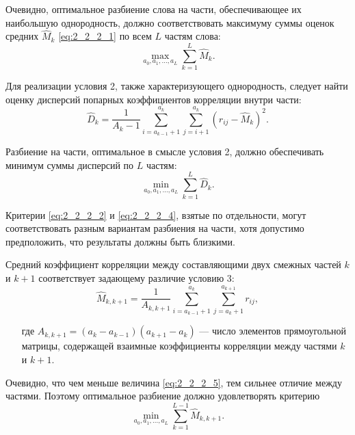 Очевидно, оптимальное разбиение слова на части, обеспечивающее их наибольшую однородность, должно соответствовать максимуму суммы оценок средних $\widehat{M}_k$ \eqref{eq:2_2_2_1} по всем $L$ частям слова:
\begin{equation}\label{eq:2_2_2_2}
\max_{a_0, a_1, \dots, a_L} \sum_{k=1}^L \widehat{M}_k.
\end{equation}

Для реализации условия 2, также характеризующего однородность, следует найти оценку дисперсий попарных коэффициентов корреляции внутри части:
\begin{equation}\label{eq:2_2_2_3}
\widehat{D}_k = \frac{1}{A_k-1} \sum^{a_k}_{i=a_{k-1}+1} \sum^{a_k}_{j=i+1} (r_{ij} - \widehat{M}_k)^2.
\end{equation}

Разбиение на части, оптимальное в смысле условия 2, должно обеспечивать минимум суммы дисперсий по $L$ частям:
\begin{equation}\label{eq:2_2_2_4}
\min_{a_0, a_1, \dots, a_L} \sum_{k=1}^L \widehat{D}_k.
\end{equation}

Критерии \eqref{eq:2_2_2_2} и \eqref{eq:2_2_2_4}, взятые по отдельности, могут соответствовать разным вариантам разбиения на части, хотя допустимо предположить, что результаты должны быть близкими.

Средний коэффициент корреляции между составляющими двух смежных частей $k$ и $k+1$ соответствует задающему различие условию 3:
\begin{equation}\label{eq:2_2_2_5}
\widehat{M}_{k,k+1} = \frac{1}{A_{k,k+1}} \sum^{a_k}_{i=a_{k-1}+1} \sum^{a_{k+1}}_{j=a_k+1} r_{ij},
\end{equation}
\begin{itemize}[align=left,leftmargin=1.8em,itemindent=0pt,labelsep=0pt,labelwidth=1.8em]
	\item[где] $A_{k,k+1} = (a_k - a_{k-1})(a_{k+1} - a_k)$ --- число элементов прямоугольной матрицы, содержащей взаимные коэффициенты корреляции между частями $k$ и $k+1$.
\end{itemize}

Очевидно, что чем меньше величина \eqref{eq:2_2_2_5}, тем сильнее отличие между частями.
Поэтому оптимальное разбиение должно удовлетворять критерию
\begin{equation}\label{eq:2_2_2_6}
\min_{a_0, a_1, \dots, a_L} \sum_{k=1}^{L-1} \widehat{M}_{k,k+1}.
\end{equation}

